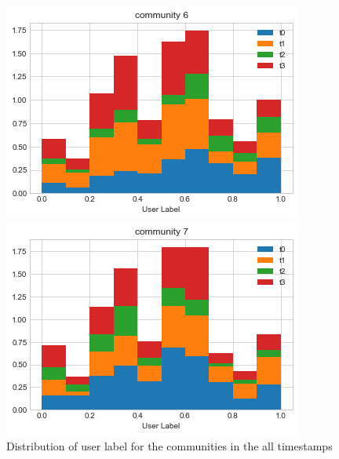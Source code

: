 \documentclass[sigchi]{acmart}
\begin{document}
\begin{figure}[h]
\begin{minipage}[b]{.48\linewidth}
\centering\includegraphics[width=0.9\linewidth]{report/img/community_distribution_6.png}
\end{minipage}
\begin{minipage}[b]{.48\linewidth}
\centering\includegraphics[width=0.9\linewidth]{report/img/community_distribution_7.png}
\end{minipage}

    \caption{Distribution of user label for the communities in the all timestamps}
    \label{fig:community_distribution_5}

\end{figure}




\end{document}
